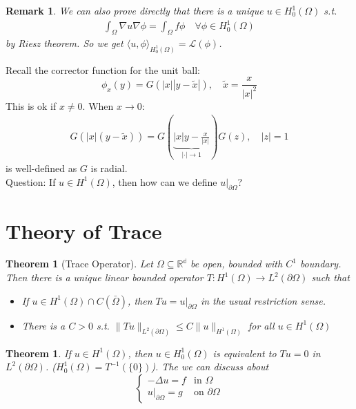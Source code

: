 \documentclass{report}
\theoremstyle{tommy}
\newtheorem{thm}[defn]{Theorem}
\newtheorem{rem}[defn]{Remark}
\begin{document}
  \begin{rem}
    We can also prove directly that there is a unique \(u \in H_0^1(\Omega)\) s.t. 
    \begin{align*}
      \int_\Omega \nabla u \nabla \phi = \int_\Omega f \phi \quad \forall \phi \in H_0^1(\Omega)
    \end{align*}    
    by Riesz theorem. So we get \(\langle u, \phi \rangle_{H_0^1(\Omega)} = \mathcal{L}(\phi)\).
  \end{rem}

  Recall the corrector function for the unit ball:
  \[\phi_x(y) = G(|x||y-\tilde x|), \quad \tilde x = \frac{x}{|x|^2}\]
  This is ok if \(x \ne 0\). When \(x \to 0\):
  \begin{align*}
    G(|x|(y-\tilde x)) = G(\underbrace{|x|y - \frac{x}{|x|}}_{|\cdot|\to 1}) G(z), \quad |z| = 1
  \end{align*}
  is well-defined as \(G\) is radial. \\
  Question: If \(u \in H^1(\Omega)\), then how can we define \(u|_{\partial \Omega}\)?

  \section{Theory of Trace}
  \begin{thm}[Trace Operator]\label{Trace Operator}
    Let \(\Omega \subseteq \mathbb{R^d}\) be open, bounded with \(C^1\) boundary. Then there is a unique linear bounded operator \(T: H^1(\Omega) \to L^2(\partial \Omega)\) such that
    \begin{itemize}
      \item If \(u \in H^1(\Omega) \cap C(\bar \Omega)\), then \(Tu = u|_{\partial \Omega}\) in the usual restriction sense.
      \item There is a \(C > 0\) s.t. \(\|Tu\|_{L^2(\partial \Omega)} \le C \|u\|_{H^1(\Omega)}\) for all \(u \in H^1(\Omega)\)
    \end{itemize}
  \end{thm}

  \begin{thm}
    If \(u \in H^1(\Omega)\), then \(u \in H_0^1(\Omega)\) is equivalent to \(Tu = 0\) in \(L^2(\partial \Omega)\). (\(H_0^1(\Omega) = T^{-1}(\{0\})\)). The we can discuss about 
    \[\begin{cases}
      - \Delta u = f & \text{in } \Omega \\ u|_{\partial \Omega} = g &\text{on } \partial \Omega
    \end{cases}\]
  \end{thm}
\end{document}
